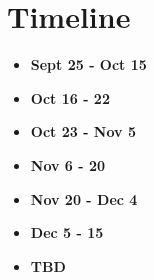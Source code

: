 \section{Timeline}
\label{sec:timeline}

\begin{itemize}
    \item \textbf{Sept 25 - Oct 15} 
    \item \textbf{Oct 16 - 22}
    \item \textbf{Oct 23 - Nov 5}
    \item \textbf{Nov 6 - 20}
    \item \textbf{Nov 20 - Dec 4} 
    \item \textbf{Dec 5 - 15}
    \item \textbf{TBD} 
\end{itemize}
